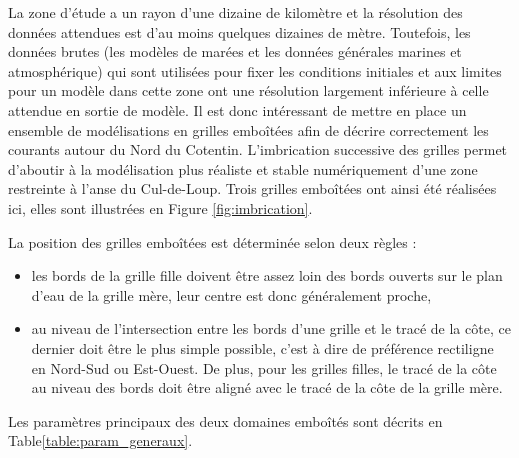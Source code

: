 \documentclass[10pt,a4paper,titlepage]{article}
\begin{document}
La zone d'étude a un rayon d'une dizaine de kilomètre et la résolution des données attendues est d'au moins quelques dizaines de mètre.
Toutefois, les données brutes (les modèles de marées et les données générales marines et atmosphérique) qui sont utilisées pour fixer les conditions initiales et aux limites pour un modèle dans cette zone ont une résolution largement inférieure à celle attendue en sortie de modèle.
Il est donc intéressant de mettre en place un ensemble de modélisations en grilles emboîtées afin de décrire correctement les courants autour du Nord du Cotentin.
L'imbrication successive des grilles permet d'aboutir à la modélisation plus réaliste et stable numériquement d'une zone restreinte à l'anse du Cul-de-Loup.
Trois grilles emboîtées ont ainsi été réalisées ici, elles sont illustrées en Figure \ref{fig:imbrication}.


La position des grilles emboîtées est déterminée selon deux règles :
\begin{itemize}
    \item les bords de la grille fille doivent être assez loin des bords ouverts sur le plan d'eau de la grille mère, leur centre est donc généralement proche,
    \item au niveau de l'intersection entre les bords d'une grille et le tracé de la côte, ce dernier doit être le plus simple possible, c'est à dire de préférence rectiligne en Nord-Sud ou Est-Ouest.
    De plus, pour les grilles filles, le tracé de la côte au niveau des bords doit être aligné avec le tracé de la côte de la grille mère.
\end{itemize}

Les paramètres principaux des deux domaines emboîtés sont décrits en Table\ref{table:param_generaux}.
\end{document}
